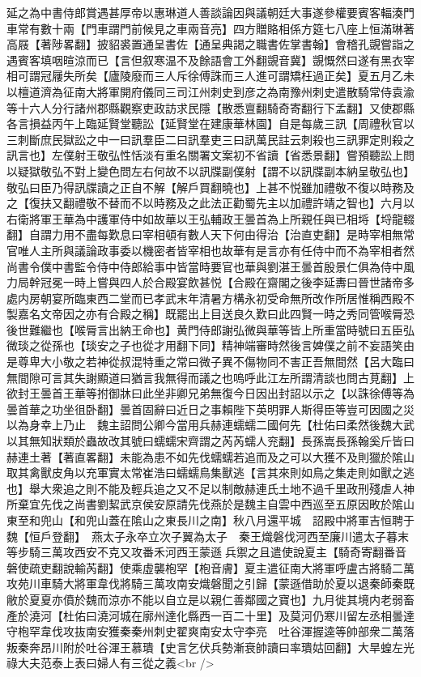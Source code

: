 延之為中書侍郎賞遇甚厚帝以惠琳道人善談論因與議朝廷大事遂參權要賓客輻湊門車常有數十兩【門車謂門前候見之車兩音亮】四方贈賂相係方筵七八座上恒滿琳著高屐【著陟畧翻】披貂裘置通呈書佐【通呈典謁之職書佐掌書翰】會稽孔覬嘗詣之遇賓客填咽暄涼而已【言但叙寒温不及餘語會工外翻覬音冀】覬慨然曰遂有黑衣宰相可謂冠屨失所矣【廬陵廢而三人斥徐傅誅而三人進可謂矯枉過正矣】夏五月乙未以檀道濟為征南大將軍開府儀同三司江州刺史到彦之為南豫州刺史遣散騎常侍袁渝等十六人分行諸州郡縣觀察吏政訪求民隱【散悉亶翻騎奇寄翻行下孟翻】又使郡縣各言損益丙午上臨延賢堂聽訟【延賢堂在建康華林園】自是每歲三訊【周禮秋官以三刺斷庶民獄訟之中一曰訊羣臣二曰訊羣吏三曰訊萬民註云刺殺也三訊罪定則殺之訊言也】左僕射王敬弘性恬淡有重名關署文案初不省讀【省悉景翻】嘗預聽訟上問以疑獄敬弘不對上變色問左右何故不以訊牒副僕射【謂不以訊牒副本納呈敬弘也】敬弘曰臣乃得訊牒讀之正自不解【解戶買翻曉也】上甚不悦雖加禮敬不復以時務及之【復扶又翻禮敬不替而不以時務及之此法正勸蜀先主以加禮許靖之智也】六月以右衛將軍王華為中護軍侍中如故華以王弘輔政王曇首為上所親任與已相埓【埒龍輟翻】自謂力用不盡每歎息曰宰相頓有數人天下何由得治【治直吏翻】是時宰相無常官唯人主所與議論政事委以機密者皆宰相也故華有是言亦有任侍中而不為宰相者然尚書令僕中書監令侍中侍郎給事中皆當時要官也華與劉湛王曇首殷景仁俱為侍中風力局幹冠冕一時上嘗與四人於合殿宴飲甚悦【合殿在齋閣之後李延夀曰晉世諸帝多處内房朝宴所臨東西二堂而已孝武末年清暑方構永初受命無所改作所居惟稱西殿不製嘉名文帝因之亦有合殿之稱】既罷出上目送良久歎曰此四賢一時之秀同管喉脣恐後世難繼也【喉脣言出納王命也】黄門侍郎謝弘微與華等皆上所重當時號曰五臣弘微琰之從孫也【琰安之子也從才用翻下同】精神端審時然後言婢僕之前不妄語笑由是尊卑大小敬之若神從叔混特重之常曰微子異不傷物同不害正吾無間然【呂大臨曰無間隙可言其失謝顯道曰猶言我無得而議之也嗚呼此江左所謂清談也問古莧翻】上欲封王曇首王華等拊御牀曰此坐非卿兄弟無復今日因出封詔以示之【以誅徐傅等為曇首華之功坐徂卧翻】曇首固辭曰近日之事賴陛下英明罪人斯得臣等豈可因國之災以為身幸上乃止　魏主詔問公卿今當用兵赫連蠕蠕二國何先【杜佑曰柔然後魏大武以其無知狀類於蟲故改其號曰蠕蠕宋齊謂之芮芮蠕人兖翻】長孫嵩長孫翰奚斤皆曰赫連土著【著直畧翻】未能為患不如先伐蠕蠕若追而及之可以大獲不及則獵於隂山取其禽獸皮角以充軍實太常崔浩曰蠕蠕鳥集獸逃【言其來則如鳥之集走則如獸之逃也】舉大衆追之則不能及輕兵追之又不足以制敵赫連氏土地不過千里政刑殘虐人神所棄宜先伐之尚書劉絜武京侯安原請先伐燕於是魏主自雲中西巡至五原因畋於隂山東至和兜山【和兜山蓋在隂山之東長川之南】秋八月還平城　詔殿中將軍吉恒聘于魏【恒戶登翻】　燕太子永卒立次子翼為太子　秦王熾磐伐河西至廉川遣太子暮末等步騎三萬攻西安不克又攻番禾河西王蒙遜兵禦之且遣使說夏主【騎奇寄翻番音磐使疏吏翻說輸芮翻】使乘虛襲枹罕【枹音膚】夏主遣征南大將軍呼盧古將騎二萬攻苑川車騎大將軍韋伐將騎三萬攻南安熾磐聞之引歸【蒙遜借助於夏以退秦師秦既敝於夏夏亦僨於魏而涼亦不能以自立是以親仁善鄰國之寶也】九月徙其境内老弱畜產於澆河【杜佑曰澆河城在廓州達化縣西一百二十里】及莫河仍寒川留左丞相曇達守枹罕韋伐攻抜南安獲秦秦州刺史翟爽南安太守李亮　吐谷渾握逵等帥部衆二萬落叛秦奔昂川附於吐谷渾王慕璝【史言乞伏兵勢漸衰帥讀曰率璝姑回翻】大旱蝗左光祿大夫范泰上表曰婦人有三從之義<br />

